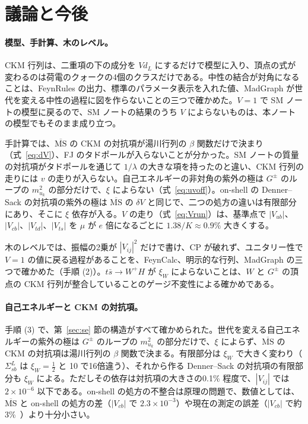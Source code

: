 \documentclass[a4paper,10pt]{ltjsarticle}
\newcommand{\MSbar}{\overline{\mathrm{MS}}}
\begin{document}
\section{議論と今後}\label{sec:discussion}

\paragraph{模型、手計算、木のレベル。}CKM 行列は、二重項の下の成分を $Vd_L$ にするだけで模型に入り、頂点の式が変わるのは荷電のクォークの4個のクラスだけである。中性の結合が対角になることは、FeynRules の出力、標準のパラメータ表示を入れた値、MadGraph が世代を変える中性の過程に図を作らないことの三つで確かめた。$V=1$ で SM ノートの模型に戻るので、SM ノートの結果のうち $V$ によらないものは、本ノートの模型でもそのまま成り立つ。

手計算では、$\MSbar$ の CKM の対抗項が湯川行列の $\beta$ 関数だけで決まり（式~\eqref{eq:dV}）、FJ のタドポールが入らないことが分かった。SM ノートの質量の対抗項がタドポールを通じて $1/\lambda$ の大きな項を持ったのと違い、CKM 行列の走りには $v$ の走りが入らない。自己エネルギーの非対角の紫外の極は $G^\pm$ のループの $m_{u_k}^2$ の部分だけで、$\xi$ によらない（式~\eqref{eq:uvoff}）。on-shell の Denner--Sack の対抗項の紫外の極は $\MSbar$ の $\delta V$ と同じで、二つの処方の違いは有限部分にあり、そこに $\xi$ 依存が入る。$V$ の走り（式~\eqref{eq:Vrun}）は、基準点で $|V_{ub}|$、$|V_{cb}|$、$|V_{td}|$、$|V_{ts}|$ を $\mu$ が $e$ 倍になるごとに $1.38/K\approx0.9\%$ 大きくする。

木のレベルでは、振幅の2乗が $|V_{ij}|^2$ だけで書け、CP が破れず、ユニタリー性で $V=1$ の値に戻る過程があることを、FeynCalc、明示的な行列、MadGraph の三つで確かめた（手順 (2)）。$t\bar s\to W^+H$ が $\xi_W$ によらないことは、$W$ と $G^\pm$ の頂点の CKM 行列が整合していることのゲージ不変性による確かめである。

\paragraph{自己エネルギーと CKM の対抗項。}手順 (3) で、第~\ref{sec:se} 節の構造がすべて確かめられた。世代を変える自己エネルギーの紫外の極は $G^\pm$ のループの $m_{u_k}^2$ の部分だけで、$\xi$ によらず、$\MSbar$ の CKM の対抗項は湯川行列の $\beta$ 関数で決まる。有限部分は $\xi_W$ で大きく変わり（$\Sigma^L_{sb}$ は $\xi_W=\frac12$ と 10 で16倍違う）、それから作る Denner--Sack の対抗項の有限部分も $\xi_W$ による。ただしその依存は対抗項の大きさの0.1\% 程度で、$|V_{ij}|$ では $2\times10^{-6}$ 以下である。on-shell の処方の不整合は原理の問題で、数値としては、$\MSbar$ と on-shell の処方の差（$|V_{cb}|$ で $2.3\times10^{-3}$）や現在の測定の誤差（$|V_{cb}|$ で約3\%~\cite{pdg24}）より十分小さい。
\end{document}
